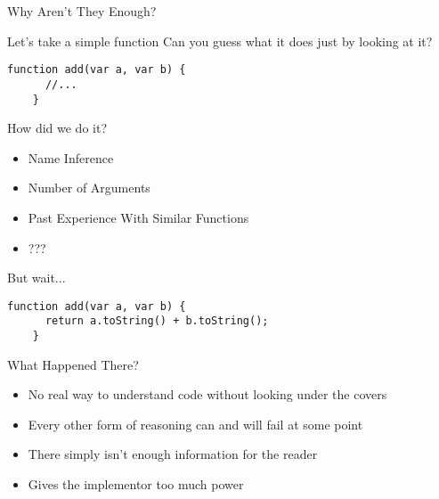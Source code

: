 \documentclass[bigger]{beamer}
\begin{document}
\begin{section}{Why Aren't They Enough?}

\begin{frame}[fragile]{Let's take a simple function}
  Can you guess what it does just by looking at it?
  \begin{lstlisting}[style=javascript]
    function add(var a, var b) {
      //...
    }
  \end{lstlisting}
\end{frame}

\begin{frame}{How did we do it?}
  \begin{center}
    \begin{itemize}
    \item Name Inference
    \item Number of Arguments
    \item Past Experience With Similar Functions
    \item ???
    \end{itemize}
\end{center}
\end{frame}

\begin{frame}[fragile]{But wait...}
    \begin{lstlisting}[style=javascript]
    function add(var a, var b) {
      return a.toString() + b.toString();
    }
  \end{lstlisting}
\end{frame}

\begin{frame}{What Happened There?}
  \begin{itemize}
    \item No real way to understand code without looking under the covers
    \item Every other form of reasoning can and will fail at some point
    \item There simply isn't enough information for the reader
    \item Gives the implementor too much power
  \end{itemize}
\end{frame}

\end{section}
\end{document}
